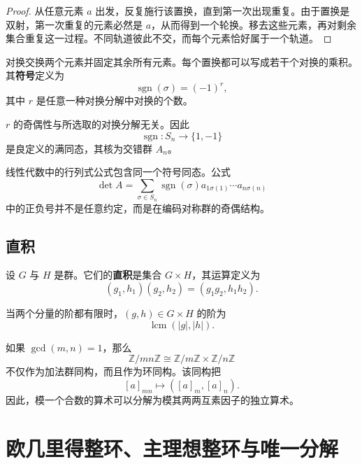 \begin{proof}
从任意元素 $a$ 出发，反复施行该置换，直到第一次出现重复。由于置换是双射，第一次重复的元素必然是 $a$，从而得到一个轮换。移去这些元素，再对剩余集合重复这一过程。不同轨道彼此不交，而每个元素恰好属于一个轨道。
\end{proof}

\begin{definition}[置换的符号]
对换交换两个元素并固定其余所有元素。每个置换都可以写成若干个对换的乘积。其\textbf{符号}定义为
\[
    \operatorname{sgn}(\sigma)=(-1)^r,
\]
其中 $r$ 是任意一种对换分解中对换的个数。
\end{definition}

\begin{theorem}
$r$ 的奇偶性与所选取的对换分解无关。因此
\[
    \operatorname{sgn}:S_n\to\{1,-1\}
\]
是良定义的满同态，其核为交错群 $A_n$。
\end{theorem}

\begin{remark}
线性代数中的行列式公式包含同一个符号同态。公式
\[
    \det A=\sum_{\sigma\in S_n}\operatorname{sgn}(\sigma)
    a_{1\sigma(1)}\cdots a_{n\sigma(n)}
\]
中的正负号并不是任意约定，而是在编码对称群的奇偶结构。
\end{remark}

\subsection{直积}

\begin{definition}[群的直积]
设 $G$ 与 $H$ 是群。它们的\textbf{直积}是集合 $G\times H$，其运算定义为
\[
    (g_1,h_1)(g_2,h_2)=(g_1g_2,h_1h_2).
\]
\end{definition}

\begin{proposition}
当两个分量的阶都有限时，$(g,h)\in G\times H$ 的阶为
\[
    \operatorname{lcm}(|g|,|h|).
\]
\end{proposition}

\begin{example}[中国剩余结构]
如果 $\gcd(m,n)=1$，那么
\[
    \mathbb{Z}/mn\mathbb{Z}
    \cong
    \mathbb{Z}/m\mathbb{Z}\times\mathbb{Z}/n\mathbb{Z}
\]
不仅作为加法群同构，而且作为环同构。该同构把
\[
    [a]_{mn}\longmapsto([a]_m,[a]_n).
\]
因此，模一个合数的算术可以分解为模其两两互素因子的独立算术。
\end{example}

\section{欧几里得整环、主理想整环与唯一分解}

